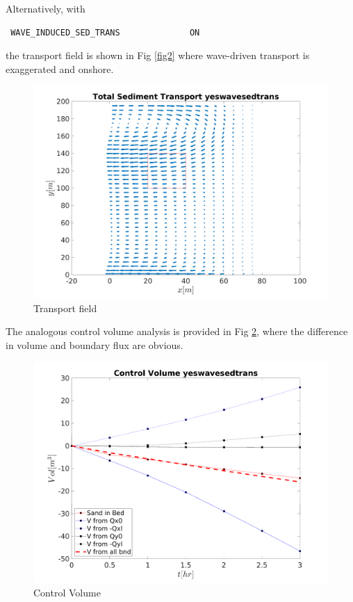 \documentclass[12pt,oneside]{article}
\begin{document}
Alternatively, with 
\begin{verbatim}
 WAVE_INDUCED_SED_TRANS              ON
\end{verbatim}
the transport field is shown in
Fig \ref{fig2} where wave-driven transport is exaggerated and onshore.
\begin{figure}
  \begin{center}
    \includegraphics[width=.8\linewidth]{./transport_vec_yeswavesedtrans.png}
  \end{center}
  \caption{Transport field}
  \label{fig4}
\end{figure}
The analogous control volume analysis is provided in Fig \ref{fig5}, where the difference in volume and boundary flux are obvious.
\begin{figure}
  \begin{center}
    \includegraphics[width=.8\linewidth]{./control_vol_yeswavesedtrans.png}
  \end{center}
  \caption{Control Volume}
  \label{fig5}
\end{figure}
\end{document}
